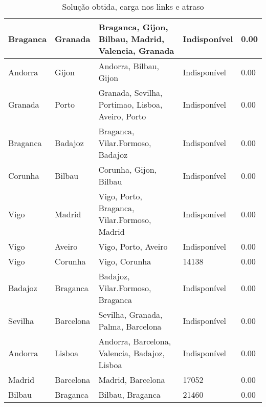 \begin{table}[!htb]
{\begin{tabular}{|l|l|l|l|l|}
Braganca & Granada & Braganca, Gijon, Bilbau, Madrid, Valencia, Granada & Indisponível & 0.00 \\ \hline
Andorra & Gijon & Andorra, Bilbau, Gijon & Indisponível & 0.00 \\ \hline
Granada & Porto & Granada, Sevilha, Portimao, Lisboa, Aveiro, Porto & Indisponível & 0.00 \\ \hline
Braganca & Badajoz & Braganca, Vilar.Formoso, Badajoz & Indisponível & 0.00 \\ \hline
Corunha & Bilbau & Corunha, Gijon, Bilbau & Indisponível & 0.00 \\ \hline
Vigo & Madrid & Vigo, Porto, Braganca, Vilar.Formoso, Madrid & Indisponível & 0.00 \\ \hline
Vigo & Aveiro & Vigo, Porto, Aveiro & Indisponível & 0.00 \\ \hline
Vigo & Corunha & Vigo, Corunha & 14138 & 0.00 \\ \hline
Badajoz & Braganca & Badajoz, Vilar.Formoso, Braganca & Indisponível & 0.00 \\ \hline
Sevilha & Barcelona & Sevilha, Granada, Palma, Barcelona & Indisponível & 0.00 \\ \hline
Andorra & Lisboa & Andorra, Barcelona, Valencia, Badajoz, Lisboa & Indisponível & 0.00 \\ \hline
Madrid & Barcelona & Madrid, Barcelona & 17052 & 0.00 \\ \hline
Bilbau & Braganca & Bilbau, Braganca & 21460 & 0.00 \\ \hline
\end{tabular}}
\caption[]{Solução obtida, carga nos links e atraso}
\end{table}

